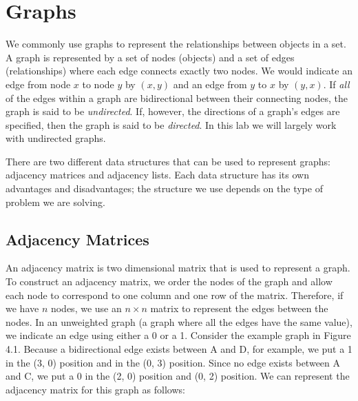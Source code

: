 \label{lab:SixDegreesKevinBacon}


\section*{Graphs}
\label{Graphs_section}
We commonly use graphs to represent the relationships between objects in a set. A graph is
represented by a set of nodes (objects) and a set of edges (relationships) where each edge
connects exactly two nodes. We would indicate an edge from node $x$ to node $y$ by $(x, y)$
and an edge from $y$ to $x$ by $(y, x)$. If \emph{all} of the edges within a graph are bidirectional
between their connecting nodes, the graph is said to be \emph{undirected}. If, however, the directions
of a graph's edges are specified, then the graph is said to be \emph{directed}. In this lab we will largely work
with undirected graphs.

There are two different data structures that can be used to represent graphs: adjacency matrices and adjacency lists.
Each data structure has its own advantages and disadvantages;
the structure we use depends on the type of problem we are solving.

\subsection*{Adjacency Matrices}
An adjacency matrix is two dimensional matrix that is used to represent a graph. To construct an adjacency matrix, we order
the nodes of the graph and allow each node to correspond to one column and one
row of the matrix. Therefore, if we have $n$ nodes, we use an $n \times n$ matrix to
represent the edges between the nodes. In an unweighted graph (a graph where all the edges have the same value), we indicate an
edge using either a 0 or a 1.
Consider the example graph in Figure 4.1. Because a bidirectional edge exists between A and D, for example, we put a 1 in the (3, 0) position and
in the (0, 3) position. Since no edge exists between A and C, we put a 0 in
the (2, 0) position and (0, 2) position. We can represent the adjacency matrix for this graph as follows:

